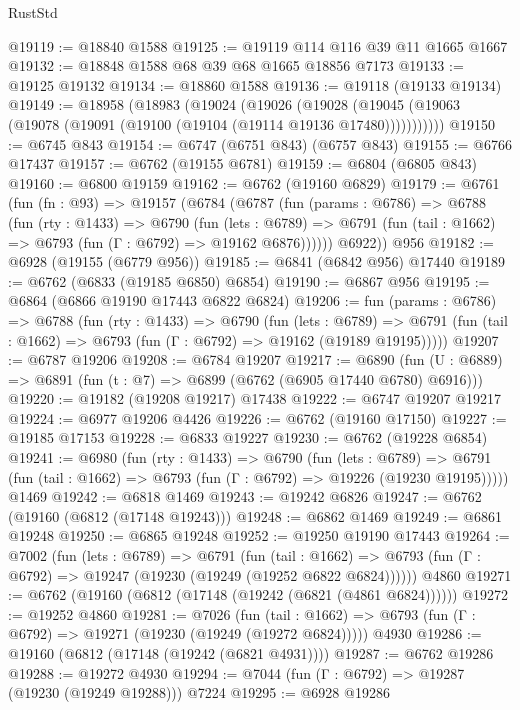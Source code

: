 \begin{lexlean}{RustStd}
\begin{coremodule}
@19119 := @18840 @1588
@19125 := @19119 @114 @116 @39 @11 @1665 @1667
@19132 := @18848 @1588 @68 @39 @68 @1665 @18856 @7173
@19133 := @19125 @19132
@19134 := @18860 @1588
@19136 := @19118 (@19133 @19134)
@19149 := @18958
    (@18983
      (@19024
        (@19026
          (@19028 (@19045 (@19063 (@19078 (@19091 (@19100 (@19104 (@19114 @19136 @17480)))))))))))
@19150 := @6745 @843
@19154 := @6747 (@6751 @843) (@6757 @843)
@19155 := @6766 @17437
@19157 := @6762 (@19155 @6781)
@19159 := @6804 (@6805 @843)
@19160 := @6800 @19159
@19162 := @6762 (@19160 @6829)
@19179 := @6761
    (fun (fn : @93) =>
    @19157
      (@6784
        (@6787
          (fun (params : @6786) =>
          @6788
            (fun (rty : @1433) =>
            @6790
              (fun (lets : @6789) =>
              @6791 (fun (tail : @1662) => @6793 (fun (Γ : @6792) => @19162 @6876))))))
        @6922))
    @956
@19182 := @6928 (@19155 (@6779 @956))
@19185 := @6841 (@6842 @956) @17440
@19189 := @6762 (@6833 (@19185 @6850) @6854)
@19190 := @6867 @956
@19195 := @6864 (@6866 @19190 @17443 @6822 @6824)
@19206 := fun (params : @6786) =>
  @6788
    (fun (rty : @1433) =>
    @6790
      (fun (lets : @6789) =>
      @6791 (fun (tail : @1662) => @6793 (fun (Γ : @6792) => @19162 (@19189 @19195)))))
@19207 := @6787 @19206
@19208 := @6784 @19207
@19217 := @6890
    (fun (U : @6889) => @6891 (fun (t : @7) => @6899 (@6762 (@6905 @17440 @6780) @6916)))
@19220 := @19182 (@19208 @19217) @17438
@19222 := @6747 @19207 @19217
@19224 := @6977 @19206 @4426
@19226 := @6762 (@19160 @17150)
@19227 := @19185 @17153
@19228 := @6833 @19227
@19230 := @6762 (@19228 @6854)
@19241 := @6980
    (fun (rty : @1433) =>
    @6790
      (fun (lets : @6789) =>
      @6791 (fun (tail : @1662) => @6793 (fun (Γ : @6792) => @19226 (@19230 @19195)))))
    @1469
@19242 := @6818 @1469
@19243 := @19242 @6826
@19247 := @6762 (@19160 (@6812 (@17148 @19243)))
@19248 := @6862 @1469
@19249 := @6861 @19248
@19250 := @6865 @19248
@19252 := @19250 @19190 @17443
@19264 := @7002
    (fun (lets : @6789) =>
    @6791
      (fun (tail : @1662) =>
      @6793 (fun (Γ : @6792) => @19247 (@19230 (@19249 (@19252 @6822 @6824))))))
    @4860
@19271 := @6762 (@19160 (@6812 (@17148 (@19242 (@6821 (@4861 @6824))))))
@19272 := @19252 @4860
@19281 := @7026
    (fun (tail : @1662) => @6793 (fun (Γ : @6792) => @19271 (@19230 (@19249 (@19272 @6824)))))
    @4930
@19286 := @19160 (@6812 (@17148 (@19242 (@6821 @4931))))
@19287 := @6762 @19286
@19288 := @19272 @4930
@19294 := @7044 (fun (Γ : @6792) => @19287 (@19230 (@19249 @19288))) @7224
@19295 := @6928 @19286

\end{coremodule}
\end{lexlean}
